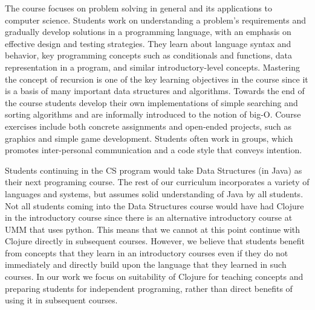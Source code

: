 \documentclass[submission,copyright,creativecommons]{eptcs}
\newcommand{\allcomments}[1]{{#1}}
\newcommand{\elenacomment}[1]{{\bf \textcolor{ForestGreen}{\allcomments{{#1}}}}}
\newcommand{\stephencomment}[1]{{\bf \color{StephensBlue}{\allcomments{{#1}}}}} %
\newcommand{\joecomment}[1]{{\bf \color{JoesGold}{\allcomments{{#1}}}}}
\begin{document}
The course focuses on problem solving in general and  its applications to computer science.
Students work on understanding a problem's requirements and gradually develop solutions in a programming language, with an emphasis on effective design and testing strategies. They learn about language syntax and behavior, key programming concepts such as conditionals and functions, data representation in a program, and similar introductory-level concepts. Mastering the concept of recursion is one of the key learning objectives in the course since it is a basis of many important data structures and algorithms. 
Towards the end of the course students develop their own implementations of simple searching and sorting algorithms and are informally introduced to the notion of big-O. Course exercises include both concrete assignments and open-ended projects, such as graphics and simple game development. Students often work in groups, which promotes inter-personal communication and a code style that conveys intention. 

Students continuing in the CS program would take 
Data Structures (in Java) as their next programing course. The rest of our curriculum incorporates a variety of languages and systems, but assumes solid understanding of Java by all students. 
Not all students coming into the Data Structures course would have had Clojure in the introductory course since there is an alternative introductory course at UMM that uses python. This means that we cannot at this point continue with Clojure directly in subsequent courses. However, we believe that students benefit from concepts that they learn in an introductory courses even if they do not immediately and directly build upon the language that they learned in such courses. In our work we focus on suitability of Clojure for teaching concepts and preparing students for independent programing, rather than direct benefits of using it in subsequent courses. 
\end{document}
